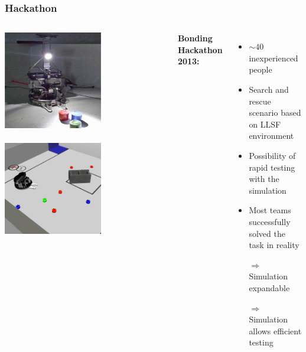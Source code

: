 \documentclass[]{beamer}
\begin{document}
\begin{frame}
  \frametitle{Hackathon}
  \begin{columns}
    \center
    \includegraphics[width=0.6\textwidth]{../pics/hackathon_real_de}\\
    \hspace{0.5cm}\\
    \includegraphics[width=0.6\textwidth]{../pics/hackathon_sim}\\
    \raggedright
    \textbf{\large Bonding Hackathon 2013:}
    \begin{itemize}
    \item $\sim 40$ inexperienced people 
    \item Search and rescue scenario based on LLSF environment
    \item Possibility of rapid testing with the simulation
    \item Most teams successfully solved the task in reality
    \item[$\Rightarrow$] Simulation expandable
    \item[$\Rightarrow$] Simulation allows efficient testing
    \end{itemize}
  \end{columns}
\end{frame}
\end{document}

